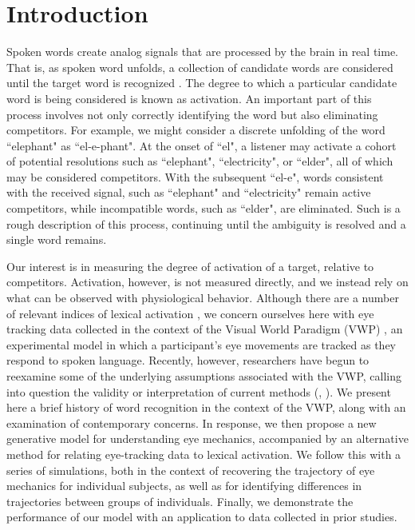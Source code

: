 \section{Introduction}


Spoken words create analog signals that are processed by the brain in real time. That is, as spoken word unfolds, a collection of candidate words are considered until the target word is recognized \citep{MarslenWilson1987}. The degree to which a particular candidate word is being considered is known as activation. An important part of this process involves not only correctly identifying the word but also eliminating competitors. For example, we might consider a discrete unfolding of the word ``elephant" as ``el-e-phant". At the onset of ``el", a listener may activate a cohort of potential resolutions such as ``elephant", ``electricity", or ``elder", all of which may be considered competitors. With the subsequent ``el-e", words consistent with the received signal, such as ``elephant" and ``electricity" remain active competitors, while incompatible words, such as ``elder", are eliminated. Such is a rough description of this process, continuing until the ambiguity is resolved and a single word remains.


Our interest is in measuring the degree of activation of a target, relative to competitors. Activation, however, is not measured directly, and we instead rely on what can be observed with physiological behavior. Although there are a number of relevant indices of lexical activation \citep{Spivey2005}, we concern ourselves here with eye tracking data collected in the context of the Visual World Paradigm (VWP) \cite{tanenhaus1995integration}, an experimental model in which a participant's eye movements are tracked as they respond to spoken language. Recently, however, researchers have begun to reexamine some of the underlying assumptions associated with the VWP, calling into question the validity or interpretation of current methods (\cite{Magnuson2019}, \cite{mcmurray2022m}). We present here a brief history of word recognition in the context of the VWP, along with an examination of contemporary concerns. In response, we then propose a new generative model for understanding eye mechanics, accompanied by an alternative method for relating eye-tracking data to lexical activation. We follow this with a series of simulations, both in the context of recovering the trajectory of eye mechanics for individual subjects, as well as for identifying differences in trajectories between groups of individuals. Finally, we demonstrate the performance of our model with an application to data collected in prior studies. 


